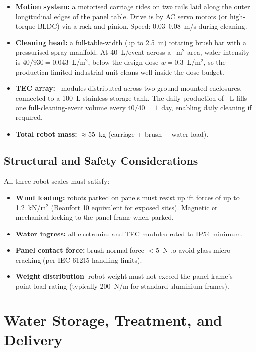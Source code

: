 \documentclass[12pt,a4paper]{report}   %
\begin{document}
\begin{itemize}[leftmargin=*]
  \item \textbf{Motion system:} a motorised carriage rides on two rails laid along the outer
  longitudinal edges of the panel table. Drive is by AC servo motors (or high-torque BLDC)
  via a rack and pinion. Speed: 0.03--0.08~m/s during cleaning.
  \item \textbf{Cleaning head:} a full-table-width (up to 2.5~m) rotating brush bar with a
  pressurised spray manifold. At 40~L/event across a \ScaleCCleanArea~m$^2$ area, water
  intensity is $40/930 = 0.043$~L/m$^2$, below the design dose $w = 0.3$~L/m$^2$,
  so the production-limited industrial unit cleans well inside the dose budget.
  \item \textbf{TEC array:} \ScaleCTECn~modules distributed across two ground-mounted enclosures,
  connected to a 100~L stainless storage tank. The daily production of \ScaleCWaterDay~L fills
  one full-cleaning-event volume every $40/40 = 1$~day, enabling daily cleaning if required.
  \item \textbf{Total robot mass:} ${\approx}$55~kg (carriage + brush + water load).
\end{itemize}

\section{Structural and Safety Considerations}

All three robot scales must satisfy:
\begin{itemize}[leftmargin=*]
  \item \textbf{Wind loading:} robots parked on panels must resist uplift forces of up to
  1.2~kN/m$^2$ (Beaufort 10 equivalent for exposed sites). Magnetic or mechanical locking to the
  panel frame when parked.
  \item \textbf{Water ingress:} all electronics and TEC modules rated to IP54 minimum.
  \item \textbf{Panel contact force:} brush normal force $< 5$~N to avoid glass micro-cracking
  (per IEC 61215 handling limits).
  \item \textbf{Weight distribution:} robot weight must not exceed the panel frame's point-load
  rating (typically 200~N/m for standard aluminium frames).
\end{itemize}

\chapter{Water Storage, Treatment, and Delivery}
\end{document}

